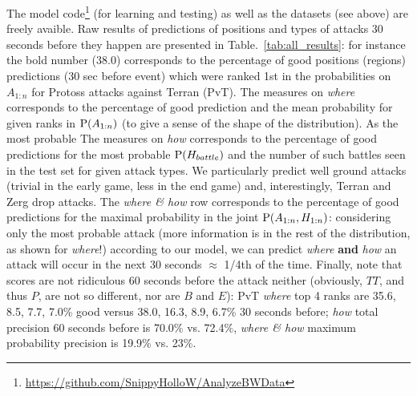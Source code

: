 The model code\footnote{\url{https://github.com/SnippyHolloW/AnalyzeBWData}} (for learning and testing) as well as the datasets (see above) are freely avaible. Raw results of predictions of positions and types of attacks 30 seconds before they happen are presented in Table.~\ref{tab:all_results}: for instance the bold number (38.0) corresponds to the percentage of good positions (regions) predictions (30 sec before event) which were ranked 1st in the probabilities on $A_{1:n}$ for Protoss attacks against Terran (PvT). The measures on \textit{where} corresponds to the percentage of good prediction and the mean probability for given ranks in $\mathrm{P}(A_{1:n})$ (to give a sense of the shape of the distribution). As the most probable The measures on \textit{how} corresponds to the percentage of good predictions for the most probable $\mathrm{P}(H_{battle})$ and the number of such battles seen in the test set for given attack types. We particularly predict well ground attacks (trivial in the early game, less in the end game) and, interestingly, Terran and Zerg drop attacks. The \textit{where \& how} row corresponds to the percentage of good predictions for the maximal probability in the joint $\mathrm{P}(A_{1:n},H_{1:n})$: considering only the most probable attack (more information is in the rest of the distribution, as shown for \textit{where}!) according to our model, we can predict \textit{where} \textbf{and} \textit{how} an attack will occur in the next 30 seconds $\approx$ 1/4th of the time. Finally, note that scores are not ridiculous 60 seconds before the attack neither (obviously, $TT$, and thus $P$, are not so different, nor are $B$ and $E$): PvT \textit{where} top 4 ranks are 35.6, 8.5, 7.7, 7.0\% good versus 38.0, 16.3, 8.9, 6.7\% 30 seconds before; \textit{how} total precision 60 seconds before is 70.0\% vs. 72.4\%, \textit{where \& how} maximum probability precision is 19.9\% vs. 23\%.

